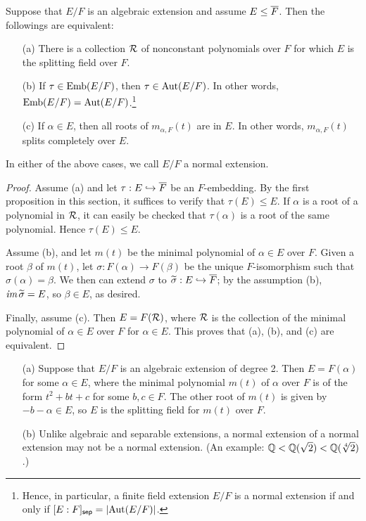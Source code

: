 \begin{thm}\label{equiv_normal_extensions}
    Suppose that $E/F$ is an algebraic extension and assume $E\leq\overline{F}$.
    Then the followings are equivalent:
    \begin{enumerate}
        \item[(a)]
        {
            There is a collection ${\mathcal{R}}$ of nonconstant polynomials over $F$ for which $E$ is the splitting field over $F$.
        }
        \item[(b)]
        {
            If $\tau\in{\textrm{Emb}({E/F})}$, then $\tau\in{\textrm{Aut}({E/F})}$.
            In other words, ${\textrm{Emb}({E/F})}={\textrm{Aut}({E/F})}$.\footnote{Hence, in particular, a finite field extension $E/F$ is a normal extension if and only if $[E:F]_{\textsf{sep}}=|{\textrm{Aut}({E/F})}|$.}
        }
        \item[(c)]
        {
            If $\alpha\in E$, then all roots of $m_{\alpha, F}(t)$ are in $E$.
            In other words, $m_{\alpha, F}(t)$ splits completely over $E$.
        }
    \end{enumerate}
    In either of the above cases, we call $E/F$ a normal extension.
\end{thm}
\begin{proof}
    Assume (a) and let $\tau: E\hookrightarrow\overline{F}$ be an $F$-embedding.
    By the first proposition in this section, it suffices to verify that $\tau(E)\leq E$.
    If $\alpha$ is a root of a polynomial in ${\mathcal{R}}$, it can easily be checked that $\tau(\alpha)$ is a root of the same polynomial.
    Hence $\tau(E)\leq E$.

    Assume (b), and let $m(t)$ be the minimal polynomial of $\alpha\in E$ over $F$.
    Given a root $\beta$ of $m(t)$, let $\sigma: F(\alpha)\rightarrow F(\beta)$ be the unique $F$-isomorphism such that $\sigma(\alpha)=\beta$.
    We then can extend $\sigma$ to $\widetilde{\sigma}: E\hookrightarrow\overline{F}$; by the assumption (b), $\textit{im\,}\widetilde{\sigma}=E$, so $\beta\in E$, as desired.

    Finally, assume (c).
    Then $E=F({\mathcal{R}})$, where ${\mathcal{R}}$ is the collection of the minimal polynomial of $\alpha\in E$ over $F$ for $\alpha\in E$.
    This proves that (a), (b), and (c) are equivalent.
\end{proof}

\begin{exmp}
    \begin{enumerate}
        \item[(a)]
        {
            Suppose that $E/F$ is an algebraic extension of degree 2.
            Then $E=F(\alpha)$ for some $\alpha\in E$, where the minimal polynomial $m(t)$ of $\alpha$ over $F$ is of the form $t^2+bt+c$ for some $b, c\in F$.
            The other root of $m(t)$ is given by $-b-\alpha\in E$, so $E$ is the splitting field for $m(t)$ over $F$.
        }
        \item[(b)]
        {
            Unlike algebraic and separable extensions, a normal extension of a normal extension may not be a normal extension.
            (An example: ${\mathbb{Q}}<{\mathbb{Q}}(\sqrt{2})<{\mathbb{Q}}(\sqrt[4]{2})$.)
        }
    \end{enumerate}
\end{exmp}

